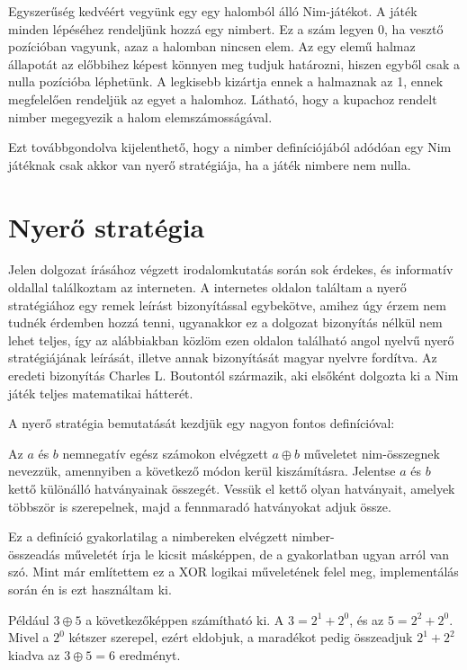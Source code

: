 Egyszerűség kedvéért vegyünk egy egy halomból álló Nim-játékot. A játék minden lépéséhez rendeljünk hozzá egy nimbert. Ez a szám legyen 0, ha vesztő pozícióban vagyunk, azaz a halomban nincsen elem. Az egy elemű halmaz állapotát az előbbihez képest könnyen meg tudjuk határozni, hiszen egyből csak a nulla pozícióba léphetünk. A legkisebb kizártja ennek a halmaznak az 1, ennek megfelelően rendeljük az egyet a halomhoz. Látható, hogy a kupachoz rendelt nimber megegyezik a halom elemszámosságával. \ujsor

Ezt továbbgondolva kijelenthető, hogy a nimber definíciójából adódóan egy Nim játéknak csak akkor van nyerő stratégiája, ha a játék nimbere nem nulla.

\section{Nyerő stratégia}
Jelen dolgozat írásához végzett irodalomkutatás során sok érdekes, és informatív oldallal találkoztam az interneten. A \cite{bibref:brilliant_nim} internetes oldalon találtam a nyerő stratégiához egy remek leírást bizonyítással egybekötve, amihez úgy érzem nem tudnék érdemben hozzá tenni, ugyanakkor ez a dolgozat bizonyítás nélkül nem lehet teljes, így az alábbiakban közlöm ezen oldalon található angol nyelvű nyerő stratégiájának leírását, illetve annak bizonyítását magyar nyelvre fordítva. Az eredeti bizonyítás Charles L. Boutontól származik, aki elsőként dolgozta ki a Nim játék teljes matematikai hátterét. \cite{bibref:bouton_nim} \ujsor

A nyerő stratégia bemutatását kezdjük egy nagyon fontos definícióval:
\begin{definition}
	Az $a$ és $b$ nemnegatív egész számokon elvégzett $a \oplus b$ műveletet nim-összegnek nevezzük, amennyiben a következő módon kerül kiszámításra. Jelentse $a$ és $b$ kettő különálló hatványainak összegét. Vessük el kettő olyan hatványait, amelyek többször is szerepelnek, majd a fennmaradó hatványokat adjuk össze.
\end{definition}

\begin{remark}
	Ez a definíció gyakorlatilag a nimbereken elvégzett nimber-\\összeadás műveletét írja le kicsit másképpen, de a gyakorlatban ugyan arról van szó. Mint már említettem ez a XOR logikai műveletének felel meg, implementálás során én is ezt használtam ki.
\end{remark}

Például $3 \oplus 5$ a következőképpen számítható ki. A $3 = 2^1 + 2^0$, és az $5 = 2^2 + 2^0$. Mivel a $2^0$ kétszer szerepel, ezért eldobjuk, a maradékot pedig  összeadjuk $2^1 + 2^2$ kiadva az $3 \oplus 5 = 6$ eredményt. \ujsor

